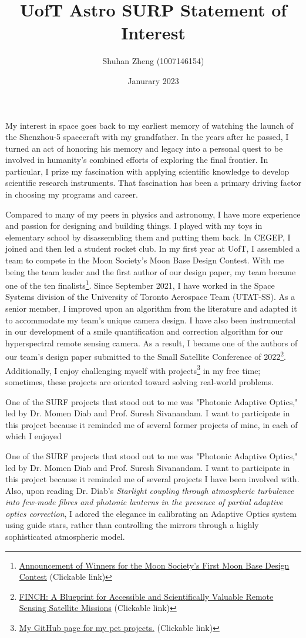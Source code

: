 \documentclass{article}
\title{UofT Astro SURP Statement of Interest}
\author{Shuhan Zheng (1007146154)}
\date{Janurary 2023}
\begin{document}
\maketitle

My interest in space goes back to my earliest memory of watching the launch of the Shenzhou-5 spacecraft with my grandfather. In the years after he passed, I turned an act of honoring his memory and legacy into a personal quest to be involved in humanity's combined efforts of exploring the final frontier. In particular, I prize my fascination with applying scientific knowledge to develop scientific research instruments. That fascination has been a primary driving factor in choosing my programs and career. 

Compared to many of my peers in physics and astronomy, I have more experience and passion for designing and building things. I played with my toys in elementary school by disassembling them and putting them back. In CEGEP, I joined and then led a student rocket club. In my first year at UofT, I assembled a team to compete in the Moon Society's Moon Base Design Contest. With me being the team leader and the first author of our design paper, my team became one of the ten finalists\footnote{\href{https://www.moonsociety.org/news/2021/03/10/announcement-of-winners-for-the-moon-societys-first-moon-base-design-contest/}{Announcement of Winners for the Moon Society's First Moon Base Design Contest} (Clickable link)}. Since September 2021, I have worked in the Space Systems division of the University of Toronto Aerospace Team (UTAT-SS). As a senior member, I improved upon an algorithm from the literature and adapted it to accommodate my team's unique camera design. I have also been instrumental in our development of a smile quantification and correction algorithm for our hyperspectral remote sensing camera. As a result, I became one of the authors of our team's design paper submitted to the Small Satellite Conference of 2022\footnote{\href{https://digitalcommons.usu.edu/smallsat/2022/all2022/88/}{FINCH: A Blueprint for Accessible and Scientifically Valuable Remote Sensing Satellite Missions} (Clickable link)}. Additionally, I enjoy challenging myself with projects\footnote{\href{https://github.com/ThisisShoo/Pet-Projects}{My GitHub page for my pet projects.} (Clickable link)} in my free time; sometimes, these projects are oriented toward solving real-world problems. 

One of the SURF projects that stood out to me was "Photonic Adaptive Optics," led by Dr. Momen Diab and Prof. Suresh Sivanandam. I want to participate in this project because it reminded me of several former projects of mine, in each of which I enjoyed 

One of the SURF projects that stood out to me was "Photonic Adaptive Optics," led by Dr. Momen Diab and Prof. Suresh Sivanandam. I want to participate in this project because it reminded me of several projects I have been involved with. Also, upon reading Dr. Diab's \textit{Starlight coupling through atmospheric turbulence into few-mode fibres and photonic lanterns in the presence of partial adaptive optics correction}, I adored the elegance in calibrating an Adaptive Optics system using guide stars, rather than controlling the mirrors through a highly sophisticated atmospheric model.
\end{document}
